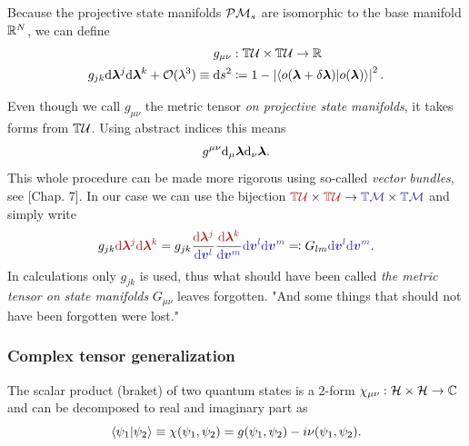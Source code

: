 \begin{definition}
Because the projective state manifolds $\mathcal{P}\mathcal{M}_s$ are isomorphic to the base manifold $\mathbb{R}^N$, we can define
    \begin{equation}
        \begin{split}
            g_{\mu\nu}&: \mathbb{T}\mathcal U\times \mathbb{T}\mathcal U\rightarrow \mathbb{R} \\
            g_{jk}\mathrm{d} \bm \lambda^j \mathrm{d}\bm \lambda^k+\mathcal{O}(\lambda^3) \equiv \mathrm{d} s^2 &\coloneqq 1-\left|\braket{o(\bm{{\bm\lambda}}+\delta\bm{{\bm\lambda}})|o(\bm{{\bm\lambda}})}\right|^2.
            \label{eq:metricTensorDef}
        \end{split}
    \end{equation} 
   
\end{definition}
Even though we call $g_{\mu\nu}$ the metric tensor \emph{on projective state manifolds}, it takes forms from $\mathbb{T}\mathcal U$. Using abstract indices this means
\begin{equation}
    g^{\mu\nu}\mathrm{d}_\mu {\bm\lambda} \mathrm{d}_\nu {\bm\lambda}.
\end{equation}
This whole procedure can be made more rigorous using so-called \emph{vector bundles}, see \cite{lu}[Chap. 7]. In our case we can use the bijection $\redd{\T\mathcal U}\times \redd{\T\mathcal U} \rightarrow \bluee{\T\M}\times \bluee{\T\M}$ and simply write
\begin{equation}
    g_{jk}\redd{\d\llambda^j \d\llambda^k} = g_{jk}\frac{\redd{\d\llambda^j}}{\bluee{\d\bm v^l}}\frac{\redd{\d\llambda^k}}{\bluee{\d\bm v^m}} \bluee{\d\bm v^l \d \bm v^m} \eqqcolon G_{lm}\bluee{\d\bm v^l \d \bm v^m}.
\end{equation}
In calculations only $g_{jk}$ is used, thus what should have been called \emph{the metric tensor on state manifolds} $G_{\mu\nu}$ leaves forgotten. "And some things that should not have been forgotten were lost." \citep{lordOfTheRings}







\subsubsection{Complex tensor generalization}
The scalar product (braket) of two quantum states is a 2-form $\chi_{\mu\nu}: \mathcal{H}\times\mathcal{H}\rightarrow \mathbb{C}$ and can be decomposed to real and imaginary part as
\begin{equation}
    \braket{\psi_1|\psi_2}\equiv \chi(\psi_1,\psi_2)=g(\psi_1,\psi_2)-i\nu(\psi_1,\psi_2).
    \label{eq:quantumProd}
\end{equation}

